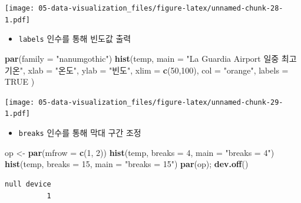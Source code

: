 \documentclass[
  11pt,
]{krantz}
\newenvironment{Shaded}{\begin{snugshade}}{\end{snugshade}}
\newcommand{\DataTypeTok}[1]{\textcolor[rgb]{0.27,0.27,0.27}{#1}}
\newcommand{\DecValTok}[1]{\textcolor[rgb]{0.06,0.06,0.06}{#1}}
\newcommand{\KeywordTok}[1]{\textcolor[rgb]{0.27,0.27,0.27}{\textbf{#1}}}
\newcommand{\NormalTok}[1]{#1}
\newcommand{\OtherTok}[1]{\textcolor[rgb]{0.37,0.37,0.37}{#1}}
\newcommand{\StringTok}[1]{\textcolor[rgb]{0.5,0.5,0.5}{#1}}
\providecommand{\tightlist}{%
  \setlength{\itemsep}{0pt}\setlength{\parskip}{0pt}}
\begin{document}
\texttt{[image: 05-data-visualization\_files/figure-latex/unnamed-chunk-28-1.pdf]}

\normalsize

\begin{itemize}
\tightlist
\item
  \texttt{labels} 인수를 통해 빈도값 출력
\end{itemize}

\footnotesize

\begin{Shaded}
\begin{Highlighting}[]
\KeywordTok{par}\NormalTok{(}\DataTypeTok{family =} \StringTok{"nanumgothic"}\NormalTok{)}
\KeywordTok{hist}\NormalTok{(temp,}
\DataTypeTok{main =} \StringTok{"La Guardia Airport 일중 최고 기온"}\NormalTok{,}
\DataTypeTok{xlab =} \StringTok{"온도"}\NormalTok{,}
\DataTypeTok{ylab =} \StringTok{"빈도"}\NormalTok{,}
\DataTypeTok{xlim =} \KeywordTok{c}\NormalTok{(}\DecValTok{50}\NormalTok{,}\DecValTok{100}\NormalTok{),}
\DataTypeTok{col =} \StringTok{"orange"}\NormalTok{,}
\DataTypeTok{labels =} \OtherTok{TRUE}
\NormalTok{)}
\end{Highlighting}
\end{Shaded}

\texttt{[image: 05-data-visualization\_files/figure-latex/unnamed-chunk-29-1.pdf]}

\normalsize

\begin{itemize}
\tightlist
\item
  \texttt{breaks} 인수를 통해 막대 구간 조정
\end{itemize}

\footnotesize

\begin{Shaded}
\begin{Highlighting}[]
\NormalTok{op <-}\StringTok{ }\KeywordTok{par}\NormalTok{(}\DataTypeTok{mfrow =} \KeywordTok{c}\NormalTok{(}\DecValTok{1}\NormalTok{, }\DecValTok{2}\NormalTok{))}
\KeywordTok{hist}\NormalTok{(temp, }\DataTypeTok{breaks =} \DecValTok{4}\NormalTok{, }\DataTypeTok{main =} \StringTok{"breaks = 4"}\NormalTok{)}
\KeywordTok{hist}\NormalTok{(temp, }\DataTypeTok{breaks =} \DecValTok{15}\NormalTok{, }\DataTypeTok{main =} \StringTok{"breaks = 15"}\NormalTok{)}
\KeywordTok{par}\NormalTok{(op); }\KeywordTok{dev.off}\NormalTok{()}
\end{Highlighting}
\end{Shaded}

\begin{verbatim}
null device 
          1 
\end{verbatim}
\end{document}
